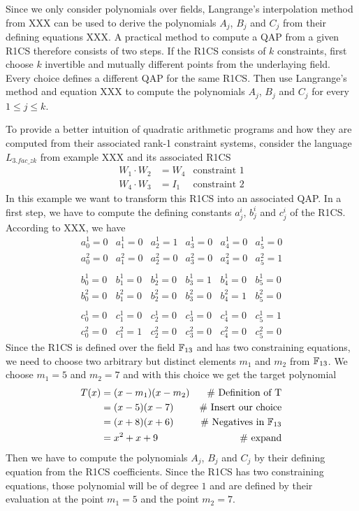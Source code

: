 Since we only consider polynomials over fields, Langrange's interpolation method from XXX can be used to derive the polynomials $A_j$, $B_j$ and $C_j$ from their defining equations XXX. A practical method to compute a QAP from a given R1CS therefore consists of two steps. If the R1CS consists of $k$ constraints, first choose $k$ invertible and mutually different points from the underlaying field. Every choice defines a different QAP for the same R1CS. Then use Langrange's method and equation XXX to compute the polynomials $A_j$, $B_j$ and $C_j$ for every $1\leq j \leq k$. 
\begin{example}  To provide a better intuition of quadratic arithmetic programs and how they are computed from their associated rank-1 constraint systems, consider the language $L_{3.fac\_zk}$ from example XXX and its associated R1CS
\begin{align*}
W_1 \cdot W_2 & = W_4 & \text{constraint } 1\\
W_4 \cdot W_3 & = I_1 & \text{constraint } 2
\end{align*}
In this example we want to transform this R1CS into an associated QAP. In a first step, we have to compute the defining constants $a_j^i$, $b_j^i$ and $c_j^i$ of the R1CS. According to XXX, we have
$$
\begin{array}{llllll}
a_0^1 = 0 & a_1^1= 0 & a_2^1= 1 & a_3^1 = 0 & a_4^1= 0  & a_5^1= 0 \\ 
a_0^2 = 0 & a_1^2= 0 & a_2^2= 0 & a_3^2 = 0 & a_4^2= 0  & a_5^2= 1 \\ 
\\
b_0^1 = 0 & b_1^1= 0 & b_2^1= 0 & b_3^1 = 1 & b_4^1= 0  & b_5^1= 0 \\ 
b_0^2 = 0 & b_1^2= 0 & b_2^2= 0 & b_3^2 = 0 & b_4^2= 1  & b_5^2= 0 \\ 
\\
c_0^1 = 0 & c_1^1= 0 & c_2^1= 0 & c_3^1 = 0 & c_4^1= 0  & c_5^1= 1 \\ 
c_0^2 = 0 & c_1^2= 1 & c_2^2= 0 & c_3^2 = 0 & c_4^2= 0  & c_5^2= 0 
\end{array} 
$$
Since the R1CS is defined over the field $\mathbb{F}_{13}$ and has two constraining equations, we need to choose two arbitrary but distinct elements $m_1$ and $m_2$ from $\mathbb{F}_{13}$. We choose $m_{1}=5$ and $m_{2}=7$ and with this choice we get the target polynomial
\begin{align*}
T(x) & = (x-m_1)(x-m_2) & \text{\# Definition of T}\\
     & = (x-5)(x-7)  & \text{\# Insert our choice}\\
     & = (x+8)(x+6)  & \text{\# Negatives in } \mathbb{F}_{13}\\
     & = x^2 + x +9 & \text{\# expand}
\end{align*}
Then we have to compute the polynomials $A_j$, $B_j$ and $C_j$ by their defining equation from the R1CS coefficients. Since the R1CS has two constraining equations, those polynomial will be of degree $1$ and are defined by their evaluation at the point $m_1=5$ and the point $m_2=7$. 


\end{example}

